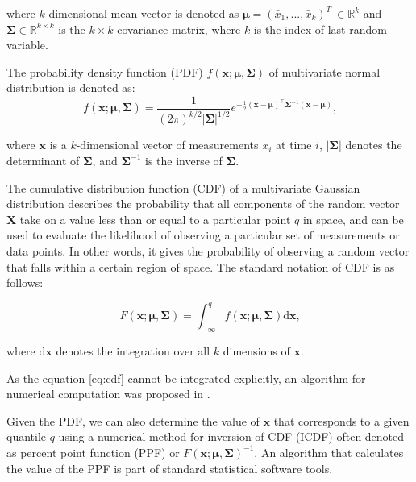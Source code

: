 where $k$-dimensional mean vector is denoted as \(\boldsymbol\mu = (\bar x_{1},...,\bar x_{k})^T\ \in \mathbb{R}^{k}\) and \(\boldsymbol\Sigma \in \mathbb{R}^{k\times{k}}\) is the $k \times k$ covariance matrix, where \(k\) is the index of last random variable.

The probability density function (PDF) \(f(\boldsymbol{x}; \boldsymbol{\mu}, \boldsymbol{\Sigma})\) of multivariate normal distribution is denoted as:
\begin{equation}
f(\boldsymbol{x}; \boldsymbol{\mu}, \boldsymbol{\Sigma}) = \frac{1}{(2\pi)^{k/2} |\boldsymbol{\Sigma}|^{1/2}} e^{-\frac{1}{2} (\boldsymbol{x}-\boldsymbol{\mu})^\top \boldsymbol{\Sigma}^{-1} (\boldsymbol{x}-\boldsymbol{\mu})}\text{,}
\end{equation}

where $\boldsymbol{x}$ is a $k$-dimensional vector of measurements $x_i$ at time $i$, $|\boldsymbol{\Sigma}|$ denotes the determinant of $\boldsymbol{\Sigma}$, and $\boldsymbol{\Sigma}^{-1}$ is the inverse of $\boldsymbol{\Sigma}$.

The cumulative distribution function (CDF) of a multivariate Gaussian distribution describes the probability that all components of the random vector \(\boldsymbol{X}\) take on a value less than or equal to a particular point \(q\) in space, and can be used to evaluate the likelihood of observing a particular set of measurements or data points. In other words, it gives the probability of observing a random vector that falls within a certain region of space. The standard notation of CDF is as follows:

\begin{equation}
F(\boldsymbol{x}; \boldsymbol{\mu}, \boldsymbol{\Sigma}) = \int_{-\infty}^{q} f(\boldsymbol{x}; \boldsymbol{\mu}, \boldsymbol{\Sigma}) \text{d}\boldsymbol{x}\text{,}\label{eq:cdf}
\end{equation}

where $\text{d}\boldsymbol{x}$ denotes the integration over all $k$ dimensions of $\boldsymbol{x}$.

As the equation \eqref{eq:cdf} cannot be integrated explicitly, an algorithm for numerical computation was proposed in \cite{Genz2000}.

Given the PDF, we can also determine the value of \(\boldsymbol{x}\) that corresponds to a given quantile $q$ using a numerical method for inversion of CDF (ICDF) often denoted as percent point function (PPF) or $F(\boldsymbol{x}; \boldsymbol{\mu}, \boldsymbol{\Sigma})^{-1}$. An algorithm that calculates the value of the PPF is part of standard statistical software tools.


